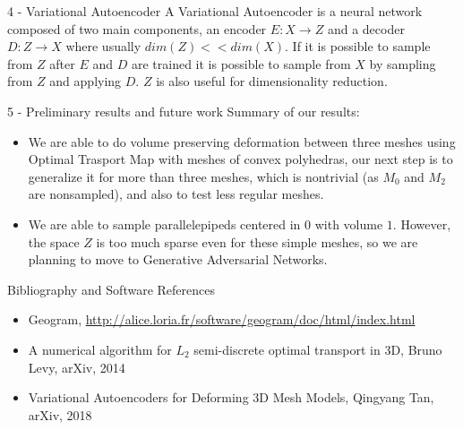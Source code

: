 \documentclass[b0paper,portrait]{baposter}
\begin{document}
\begin{poster}
\begin{posterbox}[name=vae,below=otm3,span=6,column=0]{4
    - Variational Autoencoder }
 A Variational Autoencoder is a neural network composed of two main components, an encoder $E:X\rightarrow Z$ and a decoder $D:Z\rightarrow X$ where usually $dim(Z)<<dim(X)$. If it is possible to sample from $Z$ after $E$ and $D$ are trained it is possible to sample from $X$ by sampling from $Z$ and applying $D$. $Z$ is also useful for dimensionality reduction. 
\end{posterbox}
\begin{posterbox}[name=results,below=vae,span=6,column=0]{5
    - Preliminary results and future work}
Summary of our results:
\begin{itemize}
\item We are able to do volume preserving deformation between three meshes using Optimal Trasport Map with meshes of convex polyhedras, our next step is to generalize it for more than three meshes, which is nontrivial (as $M_{0}$ and $M_{2}$ are nonsampled), and also to test less regular meshes.
\item We are able to sample parallelepipeds centered in $0$ with volume $1$. However, the space $Z$ is too much sparse even for these simple meshes, so we are planning to move to Generative Adversarial Networks. 
\end{itemize}
\end{posterbox}
\begin{posterbox}[name=bibliography,below=results,span=6,column=0]{Bibliography and Software References}
\begin{itemize}
\item Geogram, \url{http://alice.loria.fr/software/geogram/doc/html/index.html}
\item A numerical algorithm for $L_{2}$ semi-discrete optimal transport in 3D, Bruno Levy, arXiv, 2014
\item Variational Autoencoders for Deforming 3D Mesh Models, Qingyang Tan, arXiv, 2018
\end{itemize}
\end{posterbox}

\end{poster}
\end{document}
